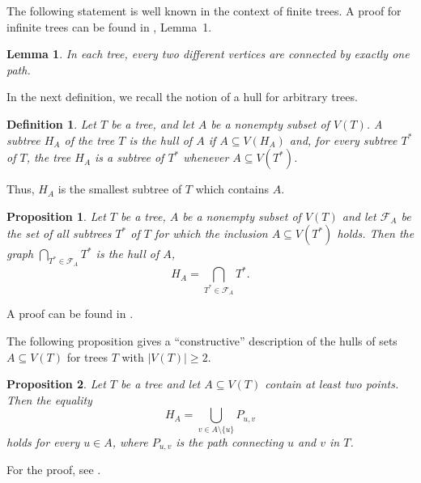 \documentclass[pdflatex,sn-mathphys-num]{sn-jnl}%
\newtheorem{proposition}{Proposition}%
\newtheorem{lemma}{Lemma}%
\newtheorem{definition}{Definition}%
\theoremstyle{thmstyletwo}%
\begin{document}
The following statement is well known in the context of finite trees. A proof for infinite trees can be found in \cite{DK2024DLPSSAG}, Lemma~1.


\begin{lemma}\label{l9.14-1}
In each tree, every two different vertices are connected by exactly one path.
\end{lemma}



In the next definition, we recall the notion of a hull for arbitrary trees.

\begin{definition}\label{d3.6}
Let \(T\) be a tree, and let \(A\) be a nonempty subset of \(V(T)\). A subtree \(H_A\) of the tree \(T\) is the \emph{hull} of \(A\) if \(A \subseteq V(H_A)\) and, for every subtree \(T^{*}\) of \(T\), the tree \(H_A\) is a subtree of \(T^{*}\) whenever \(A \subseteq V(T^*)\).
\end{definition}

Thus, \(H_A\) is the smallest subtree of \(T\) which contains \(A\). 


\begin{proposition}\label{p3.7}
Let \(T\) be a tree, \(A\) be a nonempty subset of \(V(T)\) and let \(\mathcal{F}_A\) be the set of all subtrees \(T^{*}\) of \(T\) for which the inclusion \(A \subseteq V(T^{*})\) holds. Then the graph \(\bigcap_{T^{*} \in \mathcal{F}_A} T^{*}\) is the hull of \(A\),
\begin{equation}\label{p3.7:e1}
H_A = \bigcap_{T^{*} \in \mathcal{F}_A} T^{*}.
\end{equation}
\end{proposition}

A proof can be found in \cite{DK2022LTGCCaDUS}.


The following proposition gives a ``constructive'' description of the hulls of sets $A \subseteq V(T)$ for trees $T$ with $|V(T)| \geq 2$.

\begin{proposition}\label{p3.7-1} Let $T$ be a tree and let $A \subseteq V(T)$ contain at least two points. Then the equality
\begin{equation}\label{qrrr331}
H_A = \bigcup_{v \in A \setminus \{u\}} P_{u,v}
\end{equation}
holds for every $u \in A$, where $P_{u,v}$ is the path connecting $u$ and $v$ in $T$.
\end{proposition}

For the proof, see \cite{DV2025JMS}.
\end{document}
